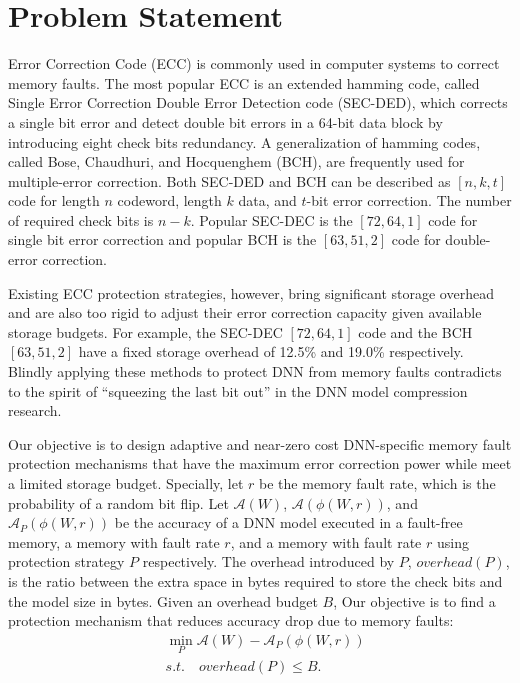 \documentclass{article}
\begin{document}


\section{Problem Statement}
Error Correction Code (ECC) is commonly used in computer systems to correct memory faults. The most popular ECC is an extended hamming code, called Single Error Correction Double Error Detection code (SEC-DED), which corrects a single bit error and detect double bit errors in a 64-bit data block by introducing eight check bits redundancy. A generalization of hamming codes, called Bose, Chaudhuri, and Hocquenghem (BCH), are frequently used for multiple-error correction. Both SEC-DED and BCH can be described as $[n, k, t]$ code for length $n$ codeword, length $k$ data, and $t$-bit error correction. The number of required check bits is $n-k$. Popular SEC-DEC is the $[72,64,1]$ code for single bit error correction and popular BCH is the $[63, 51, 2]$ code for double-error correction. 

Existing ECC protection strategies, however, bring significant storage overhead and are also too rigid to adjust their error correction capacity given available storage budgets. For example, the SEC-DEC $[72, 64, 1]$ code and the BCH $[63, 51, 2]$  have a fixed storage overhead of 12.5\% and 19.0\% respectively. Blindly applying these methods to protect DNN from memory faults contradicts to the spirit of ``squeezing the last bit out'' in the DNN model compression research. 

Our objective is to design adaptive and near-zero cost DNN-specific memory fault protection mechanisms that have the maximum error correction power while meet a limited storage budget. Specially, let $r$ be the memory fault rate, which is the probability of a random bit flip. Let $\mathcal{A}(W)$, $\mathcal{A}(\phi(W, r))$, and $\mathcal{A}_P(\phi(W, r))$ be the accuracy of a DNN model executed in a fault-free memory, a memory with fault rate $r$, and a memory with fault rate $r$ using protection strategy $P$ respectively. The overhead introduced by $P$, $overhead(P)$, is the ratio between the extra space in bytes required to store the check bits and the model size in bytes. Given an overhead budget $B$, Our objective is to find a protection mechanism that reduces accuracy drop due to memory faults:
\begin{align}
    & \min_P \mathcal{A}(W) - \mathcal{A}_P(\phi(W, r)) \nonumber \\
    & s.t. \quad overhead(P) \leq  B. \label{eq:objective}
\end{align}
\end{document}

